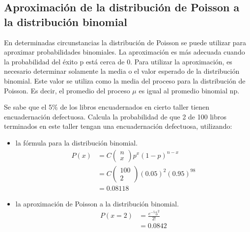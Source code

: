 \subsection{Aproximación de la distribución de Poisson a la distribución binomial}
En determinadas circunstancias la distribución de Poisson se puede utilizar para aproximar probabilidades binomiales. La aproximación es más adecuada cuando la probabilidad del éxito p está cerca de 0. Para utilizar la aproximación, es necesario determinar solamente la media o el valor esperado de la distribución binomial. Este valor se utiliza como la media del proceso para la distribución de Poisson. Es decir, el promedio del proceso  $\mu$ es igual al promedio binomial np.
\begin{ejemplo}
    Se sabe que el 5\% de los libros encuadernados en cierto taller tienen encuadernación defectuosa. Calcula la probabilidad de que 2 de 100 libros terminados en este taller tengan una encuadernación defectuosa, utilizando:
    \begin{itemize}
        \item la fórmula para la distribución binomial.
              \begin{align*}
                  P(x) & = C\left(\begin{matrix}
                          n \\
                          x
                      \end{matrix}\right) p^x (1-p)^{n-x}      \\
                       & = C\left(\begin{matrix}
                          100 \\
                          2
                      \end{matrix}\right) (0.05)^2 (0.95)^{98} \\
                       & = 0.08118
              \end{align*}
        \item la aproximación de Poisson a la distribución binomial.
              \begin{align*}
                  P(x=2) & = \frac{e^{-5}5^2}{2!} \\
                         & = 0.0842
              \end{align*}
    \end{itemize}
\end{ejemplo}